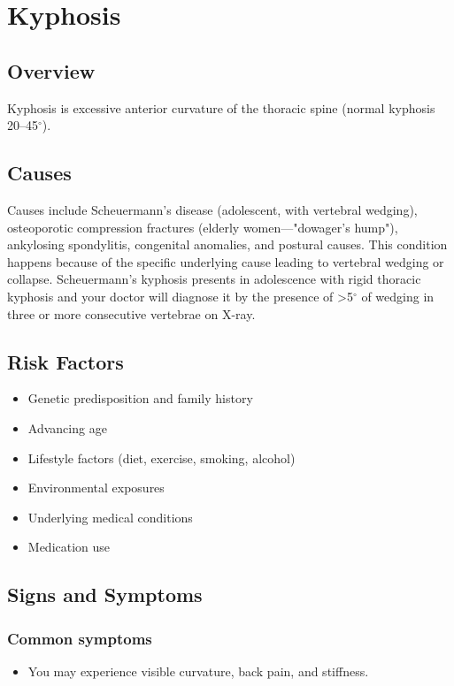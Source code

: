 \chapter{Kyphosis}
\label{sec:Kyphosis}

\section{Overview}
Kyphosis is excessive anterior curvature of the thoracic spine (normal kyphosis 20--45$^\circ$).
\section{Causes}
Causes include Scheuermann's disease (adolescent, with vertebral wedging), osteoporotic compression fractures (elderly women---"dowager's hump"), ankylosing spondylitis, congenital anomalies, and postural causes. This condition happens because of the specific underlying cause leading to vertebral wedging or collapse. Scheuermann's kyphosis presents in adolescence with rigid thoracic kyphosis and your doctor will diagnose it by the presence of >5$^\circ$ of wedging in three or more consecutive vertebrae on X-ray.     
\section{Risk Factors}

\begin{itemize}[noitemsep]
  \item Genetic predisposition and family history
  \item Advancing age
  \item Lifestyle factors (diet, exercise, smoking, alcohol)
  \item Environmental exposures
  \item Underlying medical conditions
  \item Medication use
\end{itemize}
\section{Signs and Symptoms}

\subsection{Common symptoms}
\begin{itemize}[noitemsep]
  \item You may experience visible curvature, back pain, and stiffness. 
  \end{itemize}

